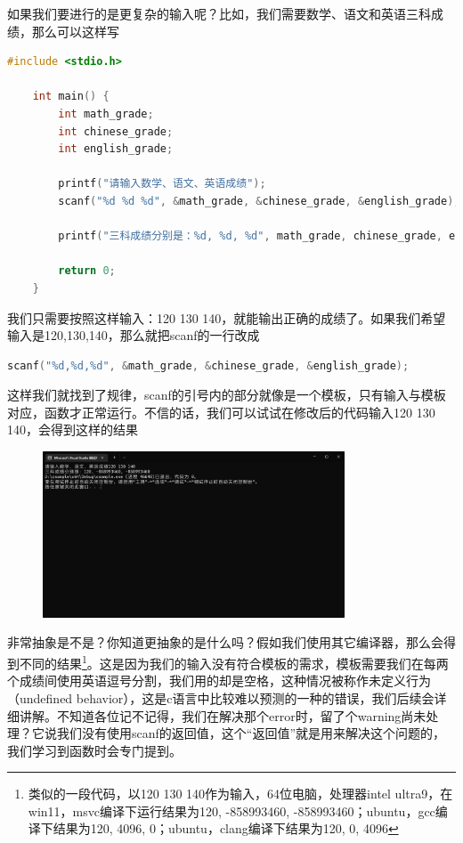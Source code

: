 如果我们要进行的是更复杂的输入呢？比如，我们需要数学、语文和英语三科成绩，那么可以这样写

\begin{lstlisting}[language=C]
    #include <stdio.h>

    int main() {
        int math_grade;
        int chinese_grade;
        int english_grade;

        printf("请输入数学、语文、英语成绩");
        scanf("%d %d %d", &math_grade, &chinese_grade, &english_grade);

        printf("三科成绩分别是：%d, %d, %d", math_grade, chinese_grade, english_grade);
        
        return 0;
    } 
\end{lstlisting}

我们只需要按照这样输入：120 130 140，就能输出正确的成绩了。如果我们希望输入是120,130,140，那么就把scanf的一行改成

\begin{lstlisting}[language=C]
    scanf("%d,%d,%d", &math_grade, &chinese_grade, &english_grade);
\end{lstlisting}

这样我们就找到了规律，scanf的引号内的部分就像是一个模板，只有输入与模板对应，函数才正常运行。不信的话，我们可以试试在修改后的代码输入120 130 140，会得到这样的结果

\begin{figure}[H]
    \centering
    \includegraphics[width=0.8\textwidth, height=0.3\textheight]{images/1scanf出错.png}
\end{figure}

非常抽象是不是？你知道更抽象的是什么吗？假如我们使用其它编译器，那么会得到不同的结果\footnote{类似的一段代码，以120 130 140作为输入，64位电脑，处理器intel ultra9，在win11，msvc编译下运行结果为120, -858993460, -858993460；ubuntu，gcc编译下结果为120, 4096, 0；ubuntu，clang编译下结果为120, 0, 4096}。这是因为我们的输入没有符合模板的需求，模板需要我们在每两个成绩间使用英语逗号分割，我们用的却是空格，这种情况被称作未定义行为（undefined behavior），这是c语言中比较难以预测的一种的错误，我们后续会详细讲解。不知道各位记不记得，我们在解决那个error时，留了个warning尚未处理？它说我们没有使用scanf的返回值，这个“返回值”就是用来解决这个问题的，我们学习到函数时会专门提到。

